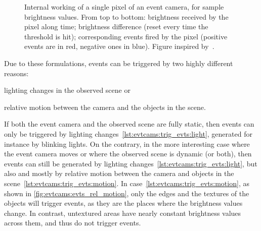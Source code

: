 \begin{figure}[t]
  \caption{Internal working of a single pixel of an event camera, for sample brightness values. From top to bottom: brightness received by the pixel along time; brightness difference (reset every time the threshold is hit); corresponding events fired by the pixel ({\color{red}positive} events are in {\color{red}red}, {\color{blue}negative} ones in {\color{blue}blue}). Figure inspired by~\cite{Gallego2020EventbasedVA}.}\label{fig:evtcams:intensity_evts}
\end{figure}

Due to these formulations, events can be triggered by two highly different reasons:
\begin{enumerate*}[label=\textbf{(\arabic*)}]
  \item lighting changes in the observed scene or\label{lst:evtcams:trig_evts:light}
  \item relative motion between the camera and the objects in the scene.\label{lst:evtcams:trig_evts:motion}
\end{enumerate*}
If both the event camera and the observed scene are fully static, then events can only be triggered by lighting changes~\ref{lst:evtcams:trig_evts:light}, generated for instance by blinking lights. On the contrary, in the more interesting case where the event camera moves or where the observed scene is dynamic (or both), then events can still be generated by lighting changes~\ref{lst:evtcams:trig_evts:light}, but also and mostly by relative motion between the camera and objects in the scene~\ref{lst:evtcams:trig_evts:motion}. In case~\ref{lst:evtcams:trig_evts:motion}, as shown in \cref{fig:evtcams:evts_rel_motion}, only the edges and the textures of the objects will trigger events, as they are the places where the brightness values change. In contrast, untextured areas have nearly constant brightness values across them, and thus do not trigger events.

